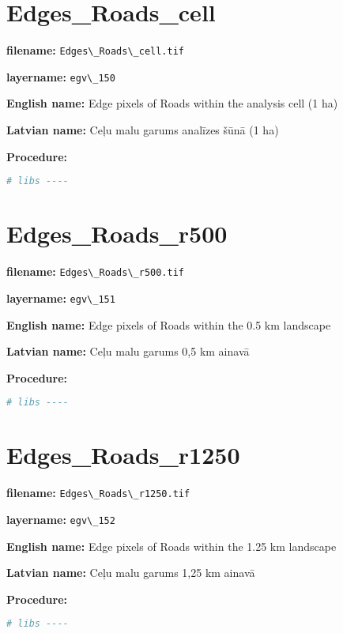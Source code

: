 \documentclass[
]{book}
\newcommand{\passthrough}[1]{#1}
\begin{document}
\section{Edges\_Roads\_cell}\label{ch06.150}

\textbf{filename:} \passthrough{\lstinline!Edges\_Roads\_cell.tif!}

\textbf{layername:} \passthrough{\lstinline!egv\_150!}

\textbf{English name:} Edge pixels of Roads within the analysis cell (1 ha)

\textbf{Latvian name:} Ceļu malu garums analīzes šūnā (1 ha)

\textbf{Procedure:}

\begin{lstlisting}[language=R]
# libs ----
\end{lstlisting}

\section{Edges\_Roads\_r500}\label{ch06.151}

\textbf{filename:} \passthrough{\lstinline!Edges\_Roads\_r500.tif!}

\textbf{layername:} \passthrough{\lstinline!egv\_151!}

\textbf{English name:} Edge pixels of Roads within the 0.5 km landscape

\textbf{Latvian name:} Ceļu malu garums 0,5 km ainavā

\textbf{Procedure:}

\begin{lstlisting}[language=R]
# libs ----
\end{lstlisting}

\section{Edges\_Roads\_r1250}\label{ch06.152}

\textbf{filename:} \passthrough{\lstinline!Edges\_Roads\_r1250.tif!}

\textbf{layername:} \passthrough{\lstinline!egv\_152!}

\textbf{English name:} Edge pixels of Roads within the 1.25 km landscape

\textbf{Latvian name:} Ceļu malu garums 1,25 km ainavā

\textbf{Procedure:}

\begin{lstlisting}[language=R]
# libs ----
\end{lstlisting}
\end{document}
